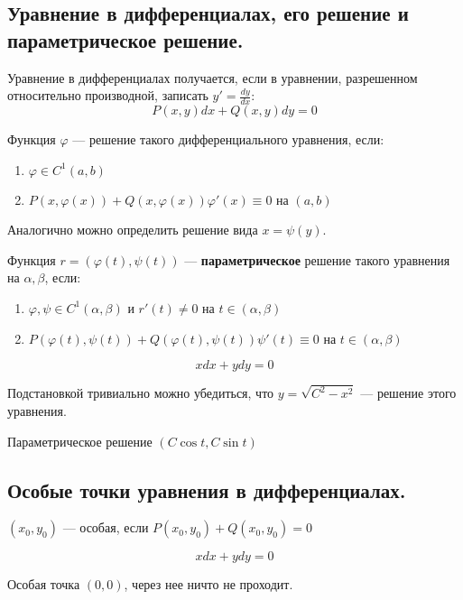 
\subsection*{Уравнение в дифференциалах, его решение и параметрическое решение.}

Уравнение в дифференциалах получается, если в уравнении, разрешенном относительно производной, записать \(y' = \frac{dy}{dx} \):
\[P(x, y) dx + Q(x, y) dy = 0\]

Функция \(\varphi\) --- решение такого дифференциального уравнения, если:
\begin{enumerate}
    \item \(\varphi\in C^1(a, b)\)
    \item \(P(x, \varphi(x)) + Q(x, \varphi(x)) \varphi'(x) \equiv 0\) на \((a, b)\)
\end{enumerate}

Аналогично можно определить решение вида \(x = \psi(y)\).

Функция \(r = (\varphi(t), \psi(t))\) --- \textbf{параметрическое} решение такого уравнения на \(\alpha, \beta\), если:
\begin{enumerate}
    \item \(\varphi, \psi\in C^{1}(\alpha, \beta)\) и \(r'(t)\neq 0\) на \(t\in (\alpha, \beta)\)
    \item \(P(\varphi(t), \psi(t)) + Q(\varphi(t), \psi(t))\psi'(t) \equiv 0\) на \(t\in (\alpha, \beta)\)
\end{enumerate}

\begin{example}
    \[xdx + ydy = 0\]

    Подстановкой тривиально можно убедиться, что \(y = \sqrt{C^2 - x^2}\) --- решение этого уравнения.

    Параметрическое решение \((C\cos t, C\sin t)\)
\end{example}

\subsection*{Особые точки уравнения в дифференциалах.}

\((x_0, y_0)\) --- особая, если \(P(x_0, y_0) + Q(x_0, y_0) = 0\)

\begin{example}
    \[xdx + ydy = 0\]

    Особая точка \((0, 0)\), через нее ничто не проходит.
\end{example}

